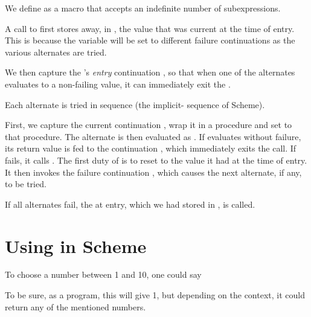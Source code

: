 We define  as a macro that accepts an indefinite
number of subexpressions.


\n A call to  first stores away, in
, the  value that was
current at the time of entry.  This is because the
 variable will be set to different failure
continuations as the various alternates are tried.

We then capture the 's {\em entry} continuation , so
that when one of the alternates evaluates to a non-failing
value, it can immediately exit the .

Each alternate  is tried in sequence (the
implicit- sequence of Scheme).

First, we capture the current continuation , wrap it
in a procedure and set  to that procedure.  The
alternate is then evaluated as .  If 
evaluates without failure, its return value is fed to the
continuation , which immediately exits the 
call.  If  fails, it calls .  The first
duty of  is to reset  to the value
it had at the time of entry.  It then invokes the failure
continuation , which causes the next alternate, if
any, to be tried.

If all alternates fail, the  at  entry,
which we had stored in , is
called.

\section{Using  in Scheme} 

To choose a number between 1 and 10, one could say


\n To be sure, as a program, this will give 1, but
depending on the context, it could return any of the
mentioned numbers.

